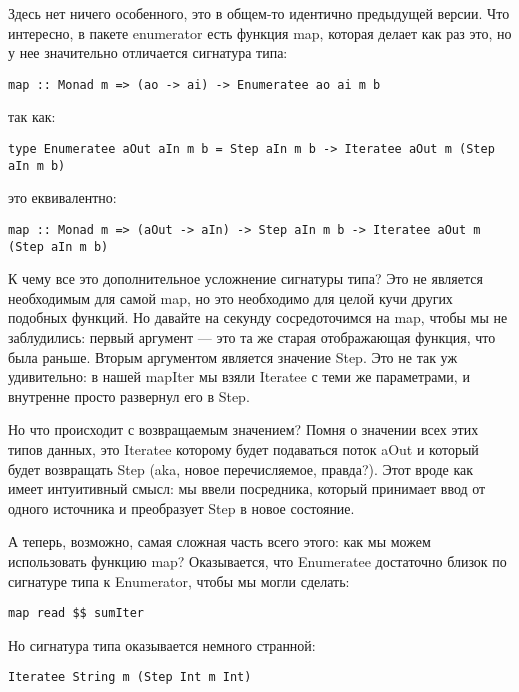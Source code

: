Здесь нет ничего особенного, это в общем-то идентично предыдущей версии. Что интересно, в пакете enumerator есть  функция map, которая делает как раз это, но у нее значительно отличается сигнатура типа:

\begin{lstlisting}
map :: Monad m => (ao -> ai) -> Enumeratee ao ai m b
\end{lstlisting}

так как:

\begin{lstlisting}
type Enumeratee aOut aIn m b = Step aIn m b -> Iteratee aOut m (Step aIn m b)
\end{lstlisting}

это еквивалентно:

\begin{lstlisting}
map :: Monad m => (aOut -> aIn) -> Step aIn m b -> Iteratee aOut m (Step aIn m b)
\end{lstlisting}

К чему все это дополнительное усложнение сигнатуры типа? Это не является необходимым для самой map, но это необходимо для целой кучи других подобных функций. Но давайте на секунду сосредоточимся на map, чтобы мы не заблудились: первый аргумент --- это та же старая отображающая функция, что была раньше. Вторым аргументом является значение Step. Это не так уж удивительно: в нашей mapIter мы взяли Iteratee с теми же параметрами, и внутренне просто развернул его в Step.

Но что происходит с возвращаемым значением? Помня о значении всех этих типов данных, это Iteratee которому будет подаваться поток aOut и который будет возвращать Step (aka, новое перечисляемое, правда?). Этот вроде как имеет интуитивный смысл: мы ввели посредника, который принимает ввод от одного источника и преобразует Step в новое состояние.

А теперь, возможно, самая сложная часть всего этого: как мы можем использовать функцию map? Оказывается, что Enumeratee достаточно близок по сигнатуре типа к Enumerator, чтобы мы могли сделать:

\begin{lstlisting}
map read $$ sumIter
\end{lstlisting}%

Но сигнатура типа оказывается немного странной:

\begin{lstlisting}
Iteratee String m (Step Int m Int)
\end{lstlisting}

